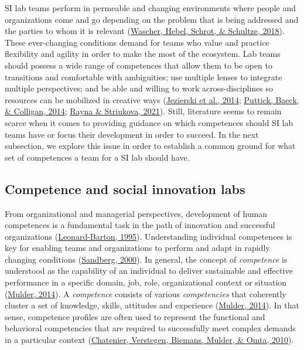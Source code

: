 \documentclass[]{elsarticle} %
\begin{document}
SI lab teams perform in permeable and changing environments where people
and organizations come and go depending on the problem that is being
addressed and the parties to whom it is relevant
(\protect\hyperlink{ref-Wascher2018}{Wascher, Hebel, Schrot, \&
Schultze, 2018}). These ever-changing conditions demand for teams who
value and practice flexibility and agility in order to make the most of
the ecosystem. Lab teams should possess a wide range of competences that
allow them to be open to transitions and comfortable with ambiguities;
use multiple lenses to integrate multiple perspectives; and be able and
willing to work across-disciplines so resources can be mobilized in
creative ways (\protect\hyperlink{ref-Jezierski2014}{Jezierski et al.,
2014}; \protect\hyperlink{ref-Puttick2014-Teams}{Puttick, Baeck, \&
Colligan, 2014}; \protect\hyperlink{ref-Rayna2021}{Rayna \& Striukova,
2021}). Still, literature seems to remain scarce when it comes to
providing guidance on which competences should SI lab teams have or
focus their development in order to succeed. In the next subsection, we
explore this issue in order to establish a common ground for what set of
competences a team for a SI lab should have.

\hypertarget{competence-and-social-innovation-labs}{%
\subsection{Competence and social innovation
labs}\label{competence-and-social-innovation-labs}}

From organizational and managerial perspectives, development of human
competences is a fundamental task in the path of innovation and
successful organizations
(\protect\hyperlink{ref-Leonard1995}{Leonard-Barton, 1995}).
Understanding individual competences is key for enabling teams and
organizations to perform and adapt in rapidly changing conditions
(\protect\hyperlink{ref-Sandberg2000}{Sandberg, 2000}). In general, the
concept of \emph{competence} is understood as the capability of an
individual to deliver sustainable and effective performance in a
specific domain, job, role, organizational context or situation
(\protect\hyperlink{ref-Mulder2014}{Mulder, 2014}). A \emph{competence}
consists of various \emph{competencies} that coherently cluster a set of
knowledge, skills, attitudes and experience
(\protect\hyperlink{ref-Mulder2014}{Mulder, 2014}). In that sense,
competence profiles are often used to represent the functional and
behavioral competencies that are required to successfully meet complex
demands in a particular context
(\protect\hyperlink{ref-Chatenier2010}{Chatenier, Verstegen, Biemans,
Mulder, \& Omta, 2010}).
\end{document}
